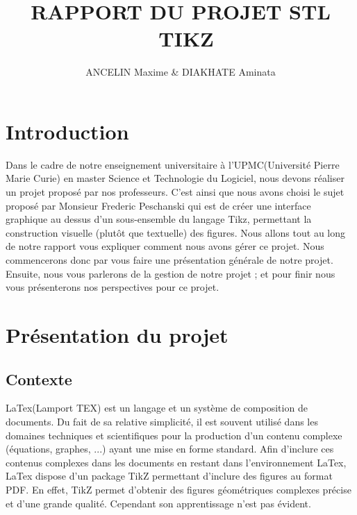 \documentclass[a4paper]{report}
\title{RAPPORT DU PROJET STL \\ TIKZ}
\author{ANCELIN Maxime & DIAKHATE Aminata}
\begin{document}

 \maketitle
 \tableofcontents
 \newpage



 \newpage
 \section{Introduction}
  Dans le cadre de notre enseignement universitaire à l'UPMC(Université Pierre Marie Curie) en master Science et Technologie du Logiciel, nous devons réaliser un projet proposé par nos professeurs. C'est ainsi que nous avons choisi le sujet proposé par Monsieur Frederic Peschanski qui est de créer une interface graphique au dessus d'un sous-ensemble du langage Tikz, permettant la construction visuelle (plutôt que textuelle) des figures. 
  \newline
  Nous allons tout au long de notre rapport vous expliquer comment nous avons gérer ce projet. Nous commencerons donc par vous faire une présentation générale de notre projet. Ensuite, nous vous parlerons de la gestion de notre projet ; et pour finir nous vous présenterons nos perspectives pour ce projet.
  \section{Présentation du projet}
  \subsection{Contexte}
  LaTex(Lamport TEX) est un langage et un système de composition de documents. Du fait de sa relative simplicité, il est souvent utilisé dans les domaines techniques et scientifiques pour la production d'un contenu complexe (équations, graphes, ...) ayant une mise en forme standard. Afin d'inclure ces contenus complexes dans les documents en restant dans l'environnement LaTex, LaTex dispose d'un package TikZ permettant d'inclure des figures au format PDF. En effet, TikZ permet d'obtenir des figures géométriques complexes précise et d'une grande qualité. Cependant son apprentissage n'est pas évident. 
\end{document}

